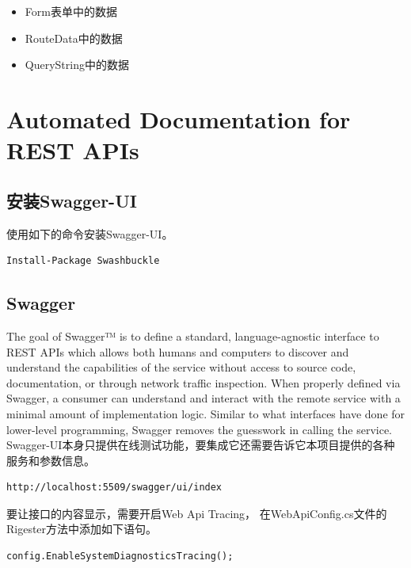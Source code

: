 \documentclass{book}
\begin{document}
\begin{itemize}
\item{Form表单中的数据}
\item{RouteData中的数据}
\item{QueryString中的数据}
\end{itemize}
    
\section{Automated Documentation for REST APIs}

\subsection{安装Swagger-UI}

使用如下的命令安装Swagger-UI。

\begin{lstlisting}[language=Bash]
Install-Package Swashbuckle
\end{lstlisting}


\subsection{Swagger}

The goal of Swagger™ is to define a standard, 
language-agnostic interface to REST APIs which allows both humans 
and computers to discover and understand the capabilities 
of the service without access to source code, documentation, 
or through network traffic inspection. 
When properly defined via Swagger, 
a consumer can understand and interact with the remote service 
with a minimal amount of implementation logic. 
Similar to what interfaces have done for lower-level programming, 
Swagger removes the guesswork in calling the service.
Swagger-UI本身只提供在线测试功能，要集成它还需要告诉它本项目提供的各种服务和参数信息。

\begin{lstlisting}[language=HTML,caption=Swagger链接]
http://localhost:5509/swagger/ui/index
\end{lstlisting}

要让接口的内容显示，需要开启Web Api Tracing，
在WebApiConfig.cs文件的Rigester方法中添加如下语句。

\begin{lstlisting}[language={[Sharp]C},caption=开启Tracing]
config.EnableSystemDiagnosticsTracing();
\end{lstlisting}
\end{document}
